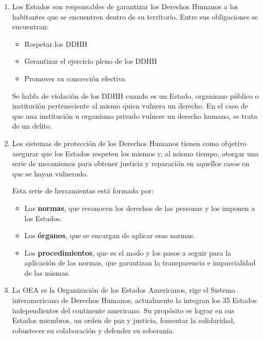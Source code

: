 \documentclass{article}
\begin{document}
\begin{enumerate}
      \item Los Estados son responsables de garantizar los Derechos Humanos a los
            habitantes que se encuentren dentro de su territorio. Entre sus obligaciones se
            encuentran:
            \begin{itemize}
                  \item Respetar los DDHH
                  \item Gerantizar el ejercicio pleno de los DDHH
                  \item Promover su concreción efectiva
            \end{itemize}

            Se habla de violación de los DDHH cuando es un Estado, organismo público o
            institución perteneciente al mismo quien vulnera un derecho. En el caso de que
            una institución u organismo privado vulnere un derecho humano, se trata de un
            delito.
      \item Los sistemas de protección de los Derechos Humanos tienen como objetivo
            asegurar que los Estados respeten los mismos y, al mismo tiempo, otorgar una
            serie de mecanismos para obtener justicia y reparación en aquellos casos en que
            se hayan vulnerado.

            Esta serie de herramientas está formada por:
            \begin{itemize}
                  \item Las \textbf{normas}, que reconocen los derechos de las personas y los imponen a
                        los Estados.
                  \item Los \textbf{órganos}, que se encargan de aplicar esas normas.
                  \item Los \textbf{procedimientos}, que es el modo y los pasos a seguir para la
                        aplicación de las normas, que garantizan la transparencia e imparcialidad de
                        las mismas.
            \end{itemize}

      \item La OEA es la Organización de los Estados Americanos, rige el Sistema
            interamericano de Derechos Humanos, actualmente la integran los 35 Estados
            independientes del continente americano. Su propósito es lograr en sus Estados
            miembros, un orden de paz y justicia, fomentar la solidaridad, robustecer su
            colaboración y defender su soberanía.


\end{enumerate}
\end{document}
